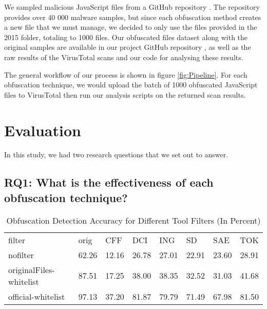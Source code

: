 \documentclass[sigplan,10pt,review, nonacm=true]{acmart}\settopmatter{printfolios=true,printccs=false,printacmref=false}
\begin{document}
We sampled malicious JavaScript files from a GitHub repository \cite{MalwareRepo}. The repository provides over 40 000 malware samples, but since each obfuscation method creates a new file that we must manage, we decided to only use the files provided in the 2015 folder, totaling to 1000 files. Our obfuscated files dataset along with the original samples are available in our project GitHub repository \cite{OurProjectRepo}, as well as the raw results of the VirusTotal scans and our code for analysing these results.

The general workflow of our process is shown in figure \ref{fig:Pipeline}. For each obfuscation technique, we would upload the batch of 1000 obfuscated JavaScript files to VirusTotal then run our analysis scripts on the returned scan results.

\section{Evaluation}

In this study, we had two research questions that we set out to answer.

\subsection{RQ1: What is the effectiveness of each obfuscation technique?}
%

\begin{table*}[]
    \caption{Obfuscation Detection Accuracy for Different Tool Filters (In Percent)}
    \label{table:table1_chunk1}
    \begin{tabular}{llllllll}
    filter                  & orig  & CFF   & DCI   & ING   & SD    & SAE   & TOK   \\
    nofilter                & 62.26 & 12.16 & 26.78 & 27.01 & 22.91 & 23.60 & 28.91 \\
    originalFiles-whitelist & 87.51 & 17.25 & 38.00 & 38.35 & 32.52 & 31.03 & 41.68 \\
    official-whitelist      & 97.13 & 37.20 & 81.87 & 79.79 & 71.49 & 67.98 & 81.50
    \end{tabular}
\end{table*}
\end{document}
